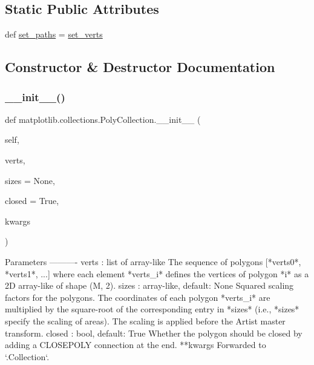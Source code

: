 \subsection*{Static Public Attributes}
\begin{DoxyCompactItemize}
\item 
def \hyperlink{classmatplotlib_1_1collections_1_1PolyCollection_a4be914300c28f1229ba5b265221d6357}{set\+\_\+paths} = \hyperlink{classmatplotlib_1_1collections_1_1PolyCollection_ada06fb0a14e12f529a52badcfd9f1d1b}{set\+\_\+verts}
\end{DoxyCompactItemize}


\subsection{Constructor \& Destructor Documentation}
\mbox{\label{classmatplotlib_1_1collections_1_1PolyCollection_a17e889c24a2423a4d5258c74d68dbd48}} 
\subsubsection{\texorpdfstring{\+\_\+\+\_\+init\+\_\+\+\_\+()}{\_\_init\_\_()}}
{\footnotesize\ttfamily def matplotlib.\+collections.\+Poly\+Collection.\+\_\+\+\_\+init\+\_\+\+\_\+ (\begin{DoxyParamCaption}\item[{}]{self,  }\item[{}]{verts,  }\item[{}]{sizes = {\ttfamily None},  }\item[{}]{closed = {\ttfamily True},  }\item[{}]{kwargs }\end{DoxyParamCaption})}

\begin{DoxyVerb}Parameters
----------
verts : list of array-like
    The sequence of polygons [*verts0*, *verts1*, ...] where each
    element *verts_i* defines the vertices of polygon *i* as a 2D
    array-like of shape (M, 2).
sizes : array-like, default: None
    Squared scaling factors for the polygons. The coordinates of each
    polygon *verts_i* are multiplied by the square-root of the
    corresponding entry in *sizes* (i.e., *sizes* specify the scaling
    of areas). The scaling is applied before the Artist master
    transform.
closed : bool, default: True
    Whether the polygon should be closed by adding a CLOSEPOLY
    connection at the end.
**kwargs
    Forwarded to `.Collection`.
\end{DoxyVerb}
 

